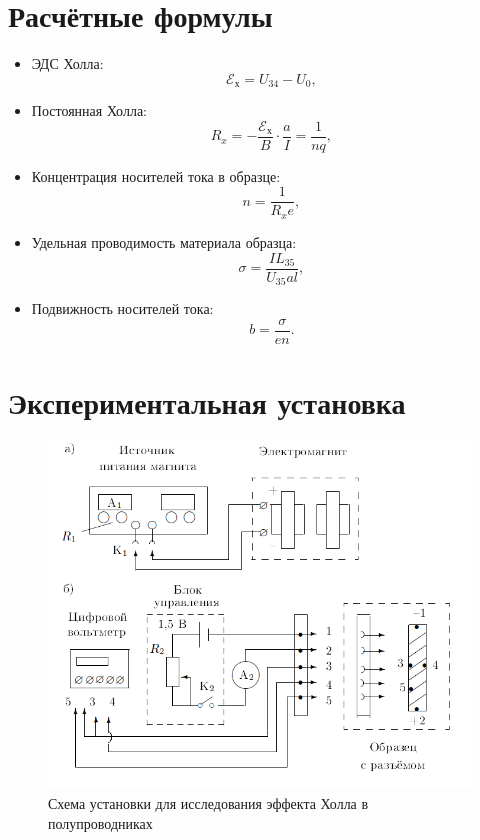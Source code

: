 \documentclass[a4paper, 12pt]{article}
\begin{document}
\section{Расчётные формулы}

\begin{itemize}
\item ЭДС Холла:
\begin{equation} \label{E}
\mathscr{E_\text{х}} = U_{34} - U_0,
\end{equation}
\item Постоянная Холла:
\begin{equation} \label{R_x}
R_x = -\frac{\mathscr{E_\text{х}}}{B}\cdot\frac{a}{I} = \frac{1}{nq},
\end{equation}
\item Концентрация носителей тока в образце:
\begin{equation} \label{n}
n = \frac{1}{R_xe},
\end{equation}
\item Удельная проводимость материала образца:
\begin{equation}	\label{sigma}
\sigma = \frac{IL_{35}}{U_{35}al},
\end{equation}
\item Подвижность носителей тока:
\begin{equation}	\label{b}
b = \frac{\sigma}{en}.
\end{equation}
\end{itemize}

\section{Экспериментальная установка}

\begin{figure}[h]
\begin{center}
\includegraphics[width=1\textwidth]{Рисунок_установки}
\end{center}
\caption{Схема установки для исследования эффекта Холла в полупроводниках}
\end{figure}
\end{document}

